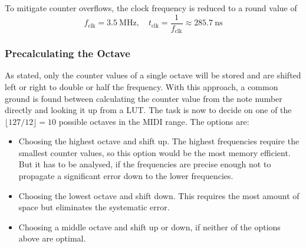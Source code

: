 To mitigate counter overflows, the clock frequency is reduced to a round value of
\begin{equation}
	f_\text{clk}=\SI{3.5}{\mega\hertz}, \quad t_{\text{clk}} = \frac{1}{f_\text{clk}} \approx \SI{285.7}{\nano\second} \label{eq:f-clk}
\end{equation}

\subsubsection{Precalculating the Octave}

As stated, only the counter values of a single octave will be stored and are shifted left or right to double or half the frequency. With this approach, a common ground is found between calculating the counter value from the note number directly and looking it up from a \acs{LUT}. The task is now to decide on one of the $\lfloor 127/12\rfloor = 10$ possible octaves in the \acs{MIDI} range. The options are:

\begin{itemize}[noitemsep]
	\item Choosing the highest octave and shift up. The highest frequencies require the smallest counter values, so this option would be the most memory efficient. But it has to be analysed, if the frequencies are precise enough not to propagate a significant error down to the lower frequencies.
	\item Choosing the lowest octave and shift down. This requires the most amount of space but eliminates the systematic error.
	\item Choosing a middle octave and shift up or down, if neither of the options above are optimal.
\end{itemize}


